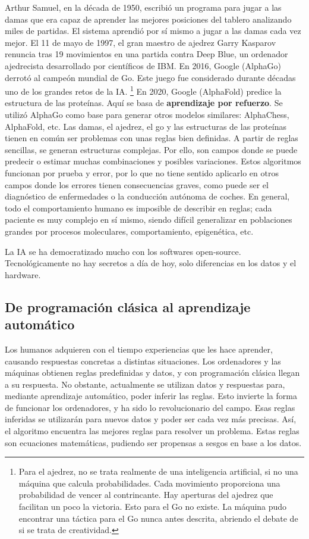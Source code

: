 Arthur Samuel, en la década de 1950, escribió un programa para jugar a las damas que era capaz de aprender las mejores posiciones del tablero analizando miles de partidas. El sistema aprendió por sí mismo a jugar a las damas cada vez mejor. El 11 de mayo de 1997, el gran maestro de ajedrez Garry Kasparov renuncia tras 19 movimientos en una partida contra Deep Blue, un ordenador ajedrecista desarrollado por científicos de IBM. En 2016, Google (AlphaGo) derrotó al campeón mundial de Go. Este juego fue considerado durante décadas uno de los grandes retos de la IA. \footnote{Para el ajedrez, no se trata realmente de una inteligencia artificial, si no una máquina que calcula probabilidades. Cada movimiento proporciona una probabilidad de vencer al contrincante. Hay aperturas del ajedrez que facilitan un poco la victoria. Esto para el Go no existe. La máquina pudo encontrar una táctica para el Go nunca antes descrita, abriendo el debate de si se trata de creatividad.} En 2020, Google (AlphaFold) predice la estructura de las proteínas. Aquí se basa de \textbf{aprendizaje por refuerzo}. Se utilizó AlphaGo como base para generar otros modelos similares: AlphaChess, AlphaFold, etc. Las damas, el ajedrez, el go y las estructuras de las proteínas tienen en común ser problemas con unas reglas bien definidas. A partir de reglas sencillas, se generan estructuras complejas. Por ello, son campos donde se puede predecir o estimar muchas combinaciones y posibles variaciones. Estos algoritmos funcionan por prueba y error, por lo que no tiene sentido aplicarlo en otros campos donde los errores tienen consecuencias graves, como puede ser el diagnóstico de enfermedades o la conducción autónoma de coches. En general, todo el comportamiento humano es imposible de describir en reglas; cada paciente es muy complejo en sí mismo, siendo difícil generalizar en poblaciones grandes por procesos moleculares, comportamiento, epigenética, etc. 

La IA se ha democratizado mucho con los softwares open-source. Tecnológicamente no hay secretos a día de hoy, solo diferencias en los datos y el hardware. 

\subsection{De programación clásica al aprendizaje automático}
Los humanos adquieren con el tiempo experiencias que les hace aprender, causando respuestas concretas a distintas situaciones. Los ordenadores y las máquinas obtienen reglas predefinidas y datos, y con programación clásica llegan a su respuesta. No obstante, actualmente se utilizan datos y respuestas para, mediante aprendizaje automático, poder inferir las reglas. Esto invierte la forma de funcionar los ordenadores, y ha sido lo revolucionario del campo. Esas reglas inferidas se utilizarán para nuevos datos y poder ser cada vez más precisas. Así, el algoritmo encuentra las mejores reglas para resolver un problema. Estas reglas son ecuaciones matemáticas, pudiendo ser propensas a sesgos en base a los datos.


